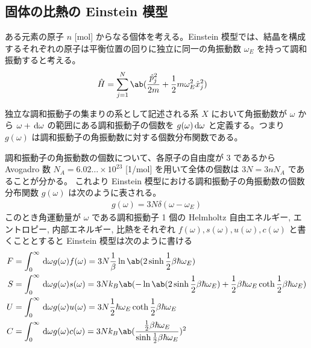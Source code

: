 \documentclass[a4paper,11pt]{jlreq}
\begin{document}
\subsection{固体の比熱の Einstein 模型}
ある元素の原子 $n$ [\si{mol}] からなる個体を考える。Einstein 模型では、結晶を構成するそれぞれの原子は平衡位置の回りに独立に同一の角振動数 $\omega_E$ を持って調和振動すると考える。
\begin{align}
  \hat{H} & = \sum_{j=1}^{N}\ab(\frac{\hat{p}_j^2}{2m} + \frac{1}{2}m\omega_E^2\hat{x}_j^2)
\end{align}

独立な調和振動子の集まりの系として記述される系 $X$ において角振動数が $\omega$ から $\omega + \dl{\omega}$ の範囲にある調和振動子の個数を $g(\omega)\dl{\omega}$ と定義する。つまり $g(\omega)$ は調和振動子の角振動数に対する個数分布関数である。

調和振動子の角振動数の個数について、各原子の自由度が $3$ であるから Avogadro 数 $N_A = 6.02\ldots\times 10^{23}$ [\si{1/mol}] を用いて全体の個数は $3N = 3nN_A$ であることが分かる。
これより Einstein 模型における調和振動子の角振動数の個数分布関数 $g(\omega)$ は次のように表される。
\begin{align}
  g(\omega) = 3N\delta(\omega - \omega_E)
\end{align}
このとき角運動量が $\omega$ である調和振動子 1 個の Helmholtz 自由エネルギー, エントロピー, 内部エネルギー, 比熱をそれぞれ $f(\omega), s(\omega), u(\omega), c(\omega)$ と書くこととすると Einstein 模型は次のように書ける
\begin{align}
  F & = \int_0^\infty\dl{\omega}g(\omega)f(\omega) = 3N\frac{1}{\beta}\ln\ab(2\sinh \frac{1}{2}\beta\hbar\omega_E)                                                            \\
  S & = \int_0^\infty\dl{\omega}g(\omega)s(\omega) = 3Nk_B\ab(-\ln\ab(2\sinh\frac{1}{2}\beta\hbar\omega_E) + \frac{1}{2}\beta\hbar\omega_E\coth\frac{1}{2}\beta\hbar\omega_E) \\
  U & = \int_0^\infty\dl{\omega}g(\omega)u(\omega) = 3N\frac{1}{2}\hbar\omega_E\coth\frac{1}{2}\beta\hbar\omega_E                                                             \\
  C & = \int_0^\infty\dl{\omega}g(\omega)c(\omega) = 3Nk_B\ab(\frac{\frac{1}{2}\beta\hbar\omega_E}{\sinh\frac{1}{2}\beta\hbar\omega_E})^2
\end{align}
\end{document}
